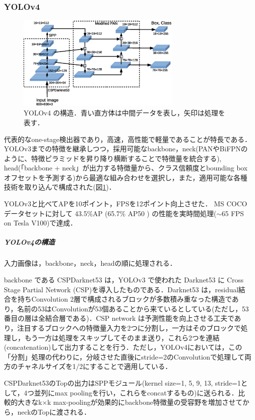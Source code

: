 \documentclass[twocolumn]{jsarticle} %
\begin{document}
\subsubsection{YOLOv4 \cite{BWL20}}
\begin{figure}[tb]
    \begin{center}
        \includegraphics[width=8cm,clip]{fig/archi_YOLOv4.eps}
    \end{center}
    \caption{ YOLOv4 の構造．青い直方体は中間データを表し，矢印は処理を表す．}
    \label{fig:archi_YOLOv4}
\end{figure}
代表的なone-stage検出器であり，高速，高性能で軽量であることが特長である．YOLOv3\cite{RedFar18}までの特徴を継承しつつ，採用可能なbackbone，neck(PANやBiFPNのように、特徴ピラミッドを昇り降り横断することで特徴量を統合する), head(「backbone + neck」が出力する特徴量から、クラス信頼度とbounding boxオフセットを予測する)から最適な組み合わせを選択し，また，適用可能な各種技術を取り込んで構成された(図\ref{fig:archi_YOLOv4})．

YOLOv3と比べてAPを10ポイント，FPSを12ポイント向上させた．
MS COCO データセットに対して 43.5\%AP (65.7\% AP50 ) の性能を実時間処理($\sim$65 FPS on Tesla V100)で達成．

\subparagraph{YOLOv4の構造}入力画像は，backbone，neck，headの順に処理される．

backbone である CSPDarknet53 は，YOLOv3 で使われた Darknet53 に Cross Stage Partial Network (CSP)を導入したものである．Darknet53 は，residual結合を持ちConvolution 2層で構成されるブロックが多数積み重なった構造であり，名前の53はConvolutionが53個あることから来ているとしている(ただし，53番目の層は全結合層である)．CSP network は予測性能を向上させる工夫であり，注目するブロックへの特徴量入力を2つに分割し，一方はそのブロックで処理し，もう一方は処理をスキップしてそのまま送り，これら2つを連結(concatenation)して出力することを行う．ただし，YOLOv4においては，この「分割」処理の代わりに，分岐させた直後にstride=2のConvolutionで処理して両方のチャネルサイズを1/2にすることで適用している．

CSPDarknet53のTopの出力はSPPモジュール(kernel size={1, 5, 9, 13}, stride=1として，4つ並列にmax poolingを行い，これらをconcatするもの)に送られる．比較的大きなk${\times}$k max-poolingが効果的にbackbone特徴量の受容野を増加させてから，neckのTopに渡される．
\end{document}

